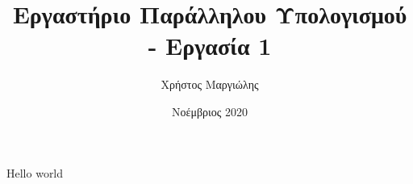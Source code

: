 \documentclass{article}
\title{Εργαστήριο Παράλληλου Υπολογισμού - Εργασία 1}
\author{Χρήστος Μαργιώλης}
\date{Νοέμβριος 2020}
\begin{document}
\begin{titlepage}
    \maketitle
\end{titlepage}


Hello world
\end{document}
